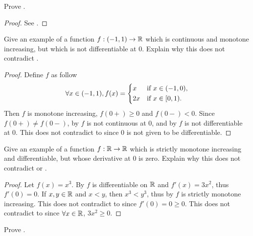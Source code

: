 \exercisesection

\begin{ex}\label{i:ex:10.3.1}
  Prove .
\end{ex}

\begin{proof}
  See .
\end{proof}

\begin{ex}\label{i:ex:10.3.2}
  Give an example of a function \(f : (-1, 1) \to \mathbb{R}\) which is continuous and monotone increasing, but which is not differentiable at \(0\).
  Explain why this does not contradict .
\end{ex}

\begin{proof}
  Define \(f\) as follow
  \[
    \forall x \in (-1, 1), f(x) = \begin{dcases}
      x  & \text{if } x \in (-1, 0), \\
      2x & \text{if } x \in [0, 1).
    \end{dcases}
  \]
  Then \(f\) is monotone increasing, \(f(0+) \geq 0\) and \(f(0-) < 0\).
  Since \(f(0+) \neq f(0-)\), by  \(f\) is not continuous at \(0\), and by  \(f\) is not differentiable at \(0\).
  This does not contradict to  since \(0\) is not given to be differentiable.
\end{proof}

\begin{ex}\label{i:ex:10.3.3}
  Give an example of a function \(f : \mathbb{R} \to \mathbb{R}\) which is strictly monotone increasing and differentiable, but whose derivative at \(0\) is zero.
  Explain why this does not contradict  or .
\end{ex}

\begin{proof}
  Let \(f(x) = x^3\).
  By  \(f\) is differentiable on \(\mathbb{R}\) and \(f'(x) = 3x^2\), thus \(f'(0) = 0\).
  If \(x, y \in \mathbb{R}\) and \(x < y\), then \(x^3 < y^3\), thus by  \(f\) is strictly monotone increasing.
  This does not contradict to  since \(f'(0) = 0 \geq 0\).
  This does not contradict to  since \(\forall x \in \mathbb{R}\), \(3x^2 \geq 0\).
\end{proof}

\begin{ex}\label{i:ex:10.3.4}
  Prove .
\end{ex}

